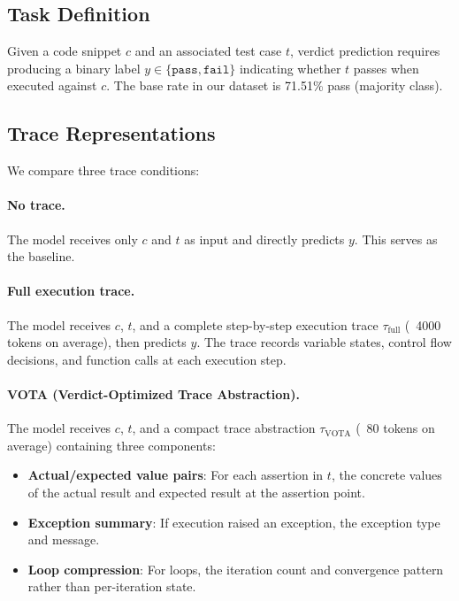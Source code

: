 \documentclass[11pt,a4paper]{article}
\begin{document}
\subsection{Task Definition}

Given a code snippet $c$ and an associated test case $t$, verdict prediction requires producing a binary label $y \in \{\texttt{pass}, \texttt{fail}\}$ indicating whether $t$ passes when executed against $c$. The base rate in our dataset is 71.51\% pass (majority class).

\subsection{Trace Representations}

We compare three trace conditions:

\paragraph{No trace.} The model receives only $c$ and $t$ as input and directly predicts $y$. This serves as the baseline.

\paragraph{Full execution trace.} The model receives $c$, $t$, and a complete step-by-step execution trace $\tau_{\text{full}}$ (~4000 tokens on average), then predicts $y$. The trace records variable states, control flow decisions, and function calls at each execution step.

\paragraph{VOTA (Verdict-Optimized Trace Abstraction).} The model receives $c$, $t$, and a compact trace abstraction $\tau_{\text{VOTA}}$ (~80 tokens on average) containing three components:
\begin{itemize}
\item \textbf{Actual/expected value pairs}: For each assertion in $t$, the concrete values of the actual result and expected result at the assertion point.
\item \textbf{Exception summary}: If execution raised an exception, the exception type and message.
\item \textbf{Loop compression}: For loops, the iteration count and convergence pattern rather than per-iteration state.
\end{itemize}
\end{document}
